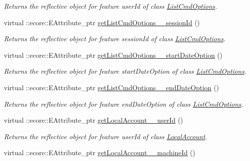 \begin{DoxyCompactItemize}
\begin{DoxyCompactList}\small\item\em Returns the reflective object for feature userId of class \hyperlink{classUMS__Data_1_1ListCmdOptions}{ListCmdOptions}. \item\end{DoxyCompactList}\item 
virtual ::ecore::EAttribute\_\-ptr \hyperlink{classUMS__Data_1_1UMS__DataPackage_a1ddb79e7d1c8e521ca355bde9924a2a4}{getListCmdOptions\_\-\_\-sessionId} ()
\begin{DoxyCompactList}\small\item\em Returns the reflective object for feature sessionId of class \hyperlink{classUMS__Data_1_1ListCmdOptions}{ListCmdOptions}. \item\end{DoxyCompactList}\item 
virtual ::ecore::EAttribute\_\-ptr \hyperlink{classUMS__Data_1_1UMS__DataPackage_adfc03c4178e12b19c2ee9892bd9fc794}{getListCmdOptions\_\-\_\-startDateOption} ()
\begin{DoxyCompactList}\small\item\em Returns the reflective object for feature startDateOption of class \hyperlink{classUMS__Data_1_1ListCmdOptions}{ListCmdOptions}. \item\end{DoxyCompactList}\item 
virtual ::ecore::EAttribute\_\-ptr \hyperlink{classUMS__Data_1_1UMS__DataPackage_ad2db3aa042c1d8af3a9836a3862c1755}{getListCmdOptions\_\-\_\-endDateOption} ()
\begin{DoxyCompactList}\small\item\em Returns the reflective object for feature endDateOption of class \hyperlink{classUMS__Data_1_1ListCmdOptions}{ListCmdOptions}. \item\end{DoxyCompactList}\item 
virtual ::ecore::EAttribute\_\-ptr \hyperlink{classUMS__Data_1_1UMS__DataPackage_a389d330ca63bf70a599b5f528485d213}{getLocalAccount\_\-\_\-userId} ()
\begin{DoxyCompactList}\small\item\em Returns the reflective object for feature userId of class \hyperlink{classUMS__Data_1_1LocalAccount}{LocalAccount}. \item\end{DoxyCompactList}\item 
virtual ::ecore::EAttribute\_\-ptr \hyperlink{classUMS__Data_1_1UMS__DataPackage_ac28eb3b356ae4487c02e496b1853d67b}{getLocalAccount\_\-\_\-machineId} ()

\end{DoxyCompactItemize}

